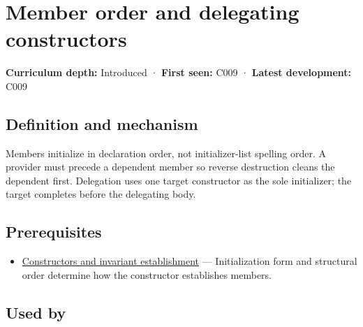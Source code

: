 \hypertarget{appendix-3cb49709605a}{}\label{referencestart:appendix-3cb49709605a}
\section{Member order and delegating constructors}\label{appendix-3cb49709605a-member-order-and-delegating-constructors}

\hypertarget{appendix-3cb49709605a-member-order-and-delegating-constructors}{}

\textbf{Curriculum depth:} Introduced · \textbf{First seen:} C009 · \textbf{Latest development:} C009

\begin{allmightroledefinition}

\subsection{Definition and mechanism}\label{appendix-3cb49709605a-definition-and-mechanism}

\hypertarget{appendix-3cb49709605a-definition-and-mechanism}{}

Members initialize in declaration order, not initializer-list spelling order. A provider must precede a dependent member so reverse destruction cleans the dependent first. Delegation uses one target constructor as the sole initializer; the target completes before the delegating body.

\end{allmightroledefinition}

\subsection{Prerequisites}\label{appendix-3cb49709605a-prerequisites}

\hypertarget{appendix-3cb49709605a-prerequisites}{}

\begin{itemize}
\tightlist
\item
  \hyperref[appendix-7f8ec83d0886]{Constructors and invariant establishment} --- Initialization form and structural order determine how the constructor establishes members.
\end{itemize}

\subsection{Used by}\label{appendix-3cb49709605a-used-by}

